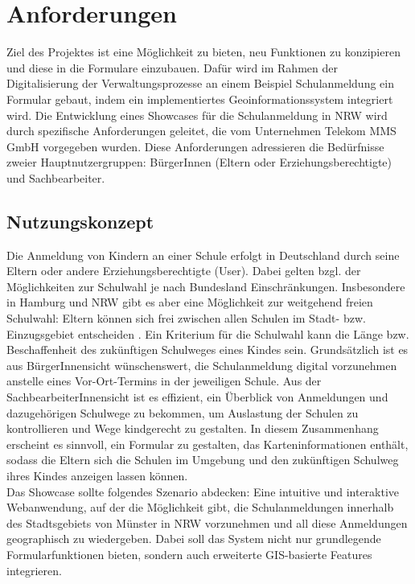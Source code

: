 \chapter{Anforderungen}
\label{cha:anforderungen}

Ziel des Projektes ist eine Möglichkeit zu bieten, neu Funktionen zu konzipieren und diese in die Formulare einzubauen. Dafür wird im Rahmen der Digitalisierung der Verwaltungsprozesse an einem Beispiel Schulanmeldung ein Formular gebaut, indem ein implementiertes Geoinformationssystem integriert wird. Die Entwicklung eines Showcases für die Schulanmeldung in NRW wird durch spezifische Anforderungen geleitet, die vom Unternehmen Telekom MMS GmbH vorgegeben wurden. Diese Anforderungen adressieren die Bedürfnisse zweier Hauptnutzergruppen: BürgerInnen (Eltern oder Erziehungsberechtigte) und Sachbearbeiter.\\


\section{Nutzungskonzept}
Die Anmeldung von Kindern an einer Schule erfolgt in Deutschland durch seine Eltern oder andere Erziehungsberechtigte (User). Dabei gelten bzgl. der Möglichkeiten zur Schulwahl je nach Bundesland Einschränkungen. Insbesondere in Hamburg und NRW gibt es aber eine Möglichkeit zur weitgehend freien Schulwahl: Eltern können sich frei zwischen allen Schulen im Stadt- bzw. Einzugsgebiet entscheiden \citep{schulwahl_nrw}. Ein Kriterium für die Schulwahl kann die Länge bzw. Beschaffenheit des zukünftigen Schulweges eines Kindes sein. Grundsätzlich ist es aus BürgerInnensicht wünschenswert, die Schulanmeldung digital vorzunehmen anstelle eines Vor-Ort-Termins in der jeweiligen Schule. Aus der SachbearbeiterInnensicht ist es effizient, ein Überblick von Anmeldungen und dazugehörigen Schulwege zu bekommen, um Auslastung der Schulen zu kontrollieren und Wege kindgerecht zu gestalten. In diesem Zusammenhang erscheint es sinnvoll, ein Formular zu gestalten, das Karteninformationen enthält, sodass die Eltern sich die Schulen im Umgebung und den zukünftigen Schulweg ihres Kindes anzeigen lassen können.\\

Das Showcase sollte folgendes Szenario abdecken: Eine intuitive und interaktive Webanwendung, auf der die Möglichkeit gibt, die Schulanmeldungen innerhalb des Stadtsgebiets von Münster in NRW vorzunehmen und all diese Anmeldungen geographisch zu wiedergeben. Dabei soll das System nicht nur grundlegende Formularfunktionen bieten, sondern auch erweiterte GIS-basierte Features integrieren.

